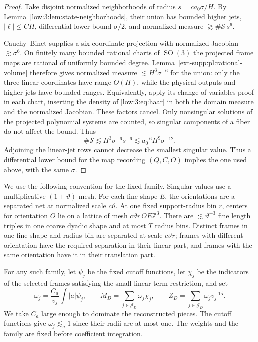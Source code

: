 \documentclass[11pt]{amsart}
\theoremstyle{definition}
\theoremstyle{remark}
\newcommand{\abs}[1]{\lvert #1\rvert}
\numberwithin{equation}{section}
\begin{document}
\begin{proof}
Take disjoint normalized neighborhoods of radius $s=c a_0\sigma/H$. By Lemma~\ref{low:3:lem:state-neighborhoods}, their union has bounded higher jets, $|\ell|\le CH$, differential lower bound $\sigma/2$, and normalized measure $\gtrsim\#\mathcal S\,s^6$.

Cauchy--Binet supplies a six-coordinate projection with normalized Jacobian $\gtrsim\sigma^6$. On finitely many bounded rational charts of $\operatorname{SO}(3)$ the projected frame maps are rational of uniformly bounded degree. Lemma~\ref{ext-supp:pl:rational-volume} therefore gives normalized measure $\lesssim H^3\sigma^{-6}$ for the union: only the three linear coordinates have range $O(H)$, while the physical outputs and higher jets have bounded ranges. Equivalently, apply its change-of-variables proof in each chart, inserting the density of \eqref{low:3:eq:haar} in both the domain measure and the normalized Jacobian. These factors cancel. Only nonsingular solutions of the projected polynomial systems are counted, so singular components of a fiber do not affect the bound. Thus
\[
\#\mathcal S\lesssim H^3\sigma^{-6}s^{-6}\lesssim a_0^{-6}H^9\sigma^{-12}.
\]
Adjoining the linear-jet rows cannot decrease the smallest singular value. Thus a differential lower bound for the map recording $(Q,C,O)$ implies the one used above, with the same $\sigma$.
\end{proof}

We use the following convention for the fixed family. Singular values use a multiplicative $(1+\vartheta)$ mesh. For each fine shape $E$, the orientations are a separated net at normalized scale $c\vartheta$. At one fixed support-radius bin $r$, centers for orientation $O$ lie on a lattice of mesh $c\vartheta r\,OE\mathbb Z^3$. There are $\lesssim\vartheta^{-3}$ fine length triples in one coarse dyadic shape and at most $T$ radius bins. Distinct frames in one fine shape and radius bin are separated at scale $c\vartheta r$; frames with different orientation have the required separation in their linear part, and frames with the same orientation have it in their translation part.

For any such family, let $\psi_j$ be the fixed cutoff functions, let $\chi_j$ be the indicators of the selected frames satisfying the small-linear-term restriction, and set
\begin{equation}\label{low:3:eq:weights}
\omega_j=\frac{C_a}{v_j}\int\abs a\psi_j,\qquad M_D=\sum_{j\in\mathcal J_D}\omega_j\chi_j,\qquad Z_D=\sum_{j\in\mathcal J_D}\omega_jv_j^{-15}.
\end{equation}
We take $C_a$ large enough to dominate the reconstructed pieces. The cutoff functions give $\omega_j\lesssim_a 1$ since their radii are at most one. The weights and the family are fixed before coefficient integration.
\end{document}
